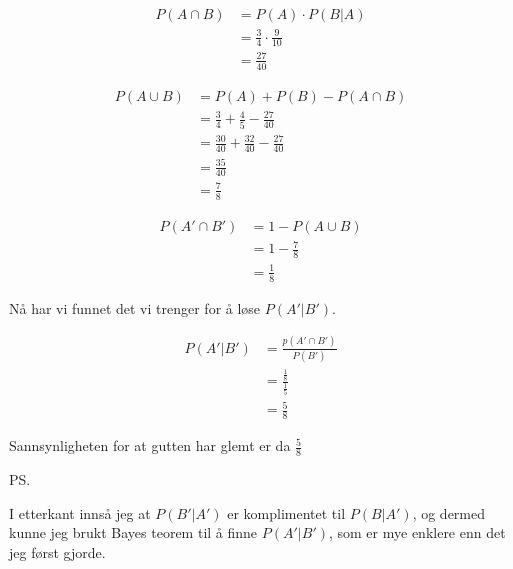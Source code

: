 \documentclass[12pt, a4paper]{article}
\begin{document}
\begin{equation}
    \begin{split}
        P(A \cap B) &= P(A) \cdot P(B|A) \\
                    &= \frac{3}{4} \cdot \frac{9}{10} \\
                    &= \frac{27}{40}
    \end{split}
\end{equation}

\begin{equation}
    \begin{split}
        P(A \cup B) &= P(A) + P(B) - P(A \cap B) \\
                    &= \frac{3}{4} + \frac{4}{5} - \frac{27}{40} \\
                    &= \frac{30}{40} + \frac{32}{40} - \frac{27}{40} \\
                    &= \frac{35}{40} \\
                    &= \frac{7}{8}
    \end{split}
\end{equation}

\begin{equation}
    \begin{split}
        P(A' \cap B') &= 1 - P(A \cup B) \\
                      &= 1 - \frac{7}{8} \\
                      &= \frac{1}{8} 
    \end{split}
\end{equation}

Nå har vi funnet det vi trenger for å løse $P(A' | B')$.

\begin{equation}
    \begin{split}
        P(A' | B') &= \frac{p(A' \cap B')}{P(B')} \\
                   &= \frac{\frac{1}{8}}{\frac{1}{5}} \\
                   &= \frac{5}{8}
    \end{split}
\end{equation}

Sannsynligheten for at gutten har glemt er da $\frac{5}{8}$

PS.

I etterkant innså jeg at $P(B' | A')$ er komplimentet til $P(B | A')$, og dermed kunne jeg brukt Bayes teorem til å finne $P(A' | B')$, 
som er mye enklere enn det jeg først gjorde.
\end{document}
